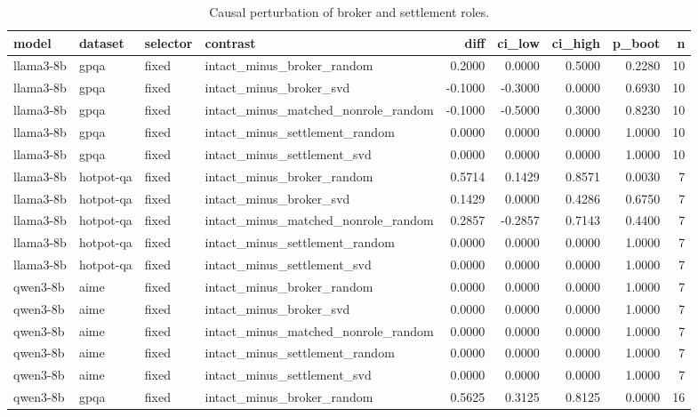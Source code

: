 \begin{table}[t]
\centering
\caption{Causal perturbation of broker and settlement roles.}
\label{tab:jun15_causal_role}
\footnotesize
\begin{tabular}{llllrrrrr}
\toprule
model & dataset & selector & contrast & diff & ci\_low & ci\_high & p\_boot & n \\
\midrule
llama3-8b & gpqa & fixed & intact\_minus\_broker\_random & 0.2000 & 0.0000 & 0.5000 & 0.2280 & 10 \\
llama3-8b & gpqa & fixed & intact\_minus\_broker\_svd & -0.1000 & -0.3000 & 0.0000 & 0.6930 & 10 \\
llama3-8b & gpqa & fixed & intact\_minus\_matched\_nonrole\_random & -0.1000 & -0.5000 & 0.3000 & 0.8230 & 10 \\
llama3-8b & gpqa & fixed & intact\_minus\_settlement\_random & 0.0000 & 0.0000 & 0.0000 & 1.0000 & 10 \\
llama3-8b & gpqa & fixed & intact\_minus\_settlement\_svd & 0.0000 & 0.0000 & 0.0000 & 1.0000 & 10 \\
llama3-8b & hotpot-qa & fixed & intact\_minus\_broker\_random & 0.5714 & 0.1429 & 0.8571 & 0.0030 & 7 \\
llama3-8b & hotpot-qa & fixed & intact\_minus\_broker\_svd & 0.1429 & 0.0000 & 0.4286 & 0.6750 & 7 \\
llama3-8b & hotpot-qa & fixed & intact\_minus\_matched\_nonrole\_random & 0.2857 & -0.2857 & 0.7143 & 0.4400 & 7 \\
llama3-8b & hotpot-qa & fixed & intact\_minus\_settlement\_random & 0.0000 & 0.0000 & 0.0000 & 1.0000 & 7 \\
llama3-8b & hotpot-qa & fixed & intact\_minus\_settlement\_svd & 0.0000 & 0.0000 & 0.0000 & 1.0000 & 7 \\
qwen3-8b & aime & fixed & intact\_minus\_broker\_random & 0.0000 & 0.0000 & 0.0000 & 1.0000 & 7 \\
qwen3-8b & aime & fixed & intact\_minus\_broker\_svd & 0.0000 & 0.0000 & 0.0000 & 1.0000 & 7 \\
qwen3-8b & aime & fixed & intact\_minus\_matched\_nonrole\_random & 0.0000 & 0.0000 & 0.0000 & 1.0000 & 7 \\
qwen3-8b & aime & fixed & intact\_minus\_settlement\_random & 0.0000 & 0.0000 & 0.0000 & 1.0000 & 7 \\
qwen3-8b & aime & fixed & intact\_minus\_settlement\_svd & 0.0000 & 0.0000 & 0.0000 & 1.0000 & 7 \\
qwen3-8b & gpqa & fixed & intact\_minus\_broker\_random & 0.5625 & 0.3125 & 0.8125 & 0.0000 & 16 \\

\end{tabular}
\end{table}
